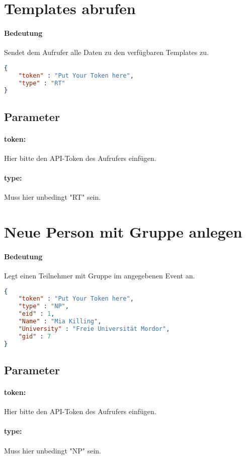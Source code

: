 \documentclass[12pt,parskip=full, pagea4]{scrreprt}
\begin{document}
			\leftskip=0cm
			
			\section{Templates abrufen}
			\paragraph{Bedeutung} Sendet dem Aufrufer alle Daten zu den verf\"ugbaren Templates zu.
			\begin{lstlisting}[language=JSON]
{
	"token" : "Put Your Token here",
	"type" : "RT"
}
			\end{lstlisting}
			\subsection{Parameter}
			\paragraph{token:}Hier bitte den API-Token des Aufrufers einf\"ugen.
			\paragraph{type:}Muss hier unbedingt "RT" sein.
						
			\section{Neue Person mit Gruppe anlegen}
			\paragraph{Bedeutung} Legt einen Teilnehmer mit Gruppe im angegebenen Event an.
			\begin{lstlisting}[language=JSON]
{
	"token" : "Put Your Token here",
	"type" : "NP",
	"eid" : 1,
	"Name" : "Mia Killing",
	"University" : "Freie Universität Mordor",
	"gid" : 7
}
			\end{lstlisting}
			\subsection{Parameter}
			\paragraph{token:}Hier bitte den API-Token des Aufrufers einf\"ugen.
			\paragraph{type:}Muss hier unbedingt "NP" sein.
\end{document}
